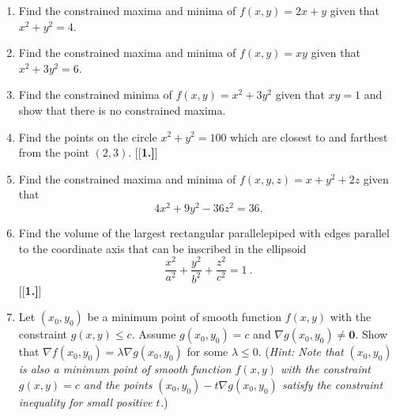 \startexercises\label{sec2dot7}
\begin{enumerate}[\bfseries 1.]
 \item Find the constrained maxima and minima of $f(x,y) = 2x+y$ given that $x^2 + y^2 =4$.
 \item Find the constrained maxima and minima of $f(x,y) = xy$ given that $x^2 + 3y^2 =6$.
 \item Find the constrained minima of $f(x,y) = x^2 + 3y^2$ given that $xy =1$ and show that there is no constrained maxima.
 \item Find the points on the circle $x^2 + y^2 = 100$ which are closest to and farthest from the point $(2,3)$.
[{[\bfseries 1.]}]
 \item Find the constrained maxima and minima of $f(x,y,z) = x+y^2 +2z$ given that 
 \[4x^2 + 9y^2 -36z^2 =36.\]
 \item Find the volume of the largest rectangular parallelepiped with edges parallel to the coordinate axis that can be inscribed in the ellipsoid
  \begin{displaymath}
   \frac{x^2}{a^2} + \frac{y^2}{b^2} + \frac{z^2}{c^2} = 1 ~.
  \end{displaymath}
[{[\bfseries 1.]}]
\item Let $(x_0,y_0)$ be a minimum point of smooth function $f(x,y)$ with the constraint $g(x,y)\le c$.
Assume $g(x_0,y_0)=c$ and $\nabla g(x_0,y_0)\ne \mathbf{0}$.
Show that  
$\nabla f(x_0,y_0)=\lambda \nabla g(x_0,y_0)$
for some $\lambda\le 0$. 
(\emph{Hint: Note that $(x_0,y_0)$ is also a minimum point of smooth function $f(x,y)$ with the constraint $g(x,y)=c$ and the points $(x_0,y_0)-t\nabla g(x_0,y_0)$ satisfy the constraint inequality for small positive $t$.})

\end{enumerate}

